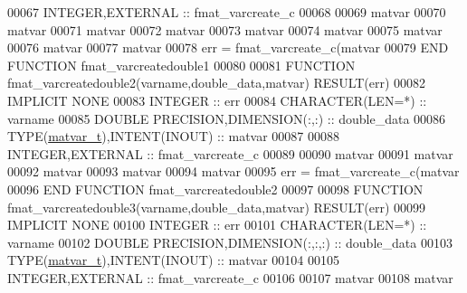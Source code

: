 \begin{DoxyCode}
00067     \textcolor{keywordtype}{INTEGER},\textcolor{keywordtype}{EXTERNAL}                :: fmat\_varcreate\_c
00068 
00069     matvar%
00070     matvar%
00071     matvar%
00072     matvar%
00073     matvar%
00074     matvar%
00075     matvar%
00076     matvar%
00077     matvar%
00078     err = fmat\_varcreate\_c(matvar%
00079 \textcolor{keyword}{END FUNCTION }fmat\_varcreatedouble1
00080 
00081 \textcolor{keyword}{FUNCTION }fmat\_varcreatedouble2(varname,double\_data,matvar) \textcolor{keyword}{RESULT}(err)
00082 \textcolor{keywordtype}{IMPLICIT NONE}
00083     \textcolor{keywordtype}{INTEGER}                         :: err
00084     \textcolor{keywordtype}{CHARACTER(LEN=*)}                :: varname
00085     \textcolor{keywordtype}{DOUBLE PRECISION},\textcolor{keywordtype}{DIMENSION(:,:)} :: double\_data
00086     \textcolor{keywordtype}{TYPE}(\hyperlink{group___m_a_t_structmatvar__t}{matvar\_t}),\textcolor{keywordtype}{INTENT(INOUT)}    :: matvar
00087 
00088     \textcolor{keywordtype}{INTEGER},\textcolor{keywordtype}{EXTERNAL}                :: fmat\_varcreate\_c
00089 
00090     matvar%
00091     matvar%
00092     matvar%
00093     matvar%
00094     matvar%
00095     err = fmat\_varcreate\_c(matvar%
00096 \textcolor{keyword}{END FUNCTION }fmat\_varcreatedouble2
00097 
00098 \textcolor{keyword}{FUNCTION }fmat\_varcreatedouble3(varname,double\_data,matvar) \textcolor{keyword}{RESULT}(err)
00099 \textcolor{keywordtype}{IMPLICIT NONE}
00100     \textcolor{keywordtype}{INTEGER}                         :: err
00101     \textcolor{keywordtype}{CHARACTER(LEN=*)}                :: varname
00102     \textcolor{keywordtype}{DOUBLE PRECISION},\textcolor{keywordtype}{DIMENSION(:,:,:)} :: double\_data
00103     \textcolor{keywordtype}{TYPE}(\hyperlink{group___m_a_t_structmatvar__t}{matvar\_t}),\textcolor{keywordtype}{INTENT(INOUT)}    :: matvar
00104 
00105     \textcolor{keywordtype}{INTEGER},\textcolor{keywordtype}{EXTERNAL}                :: fmat\_varcreate\_c
00106 
00107     matvar%
00108     matvar%

\end{DoxyCode}
